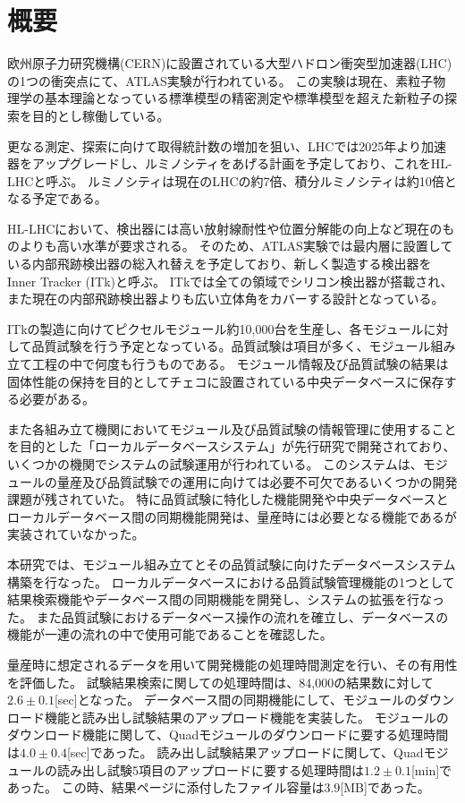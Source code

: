 \chapter*{概要}

欧州原子力研究機構(CERN)に設置されている大型ハドロン衝突型加速器(LHC)の1つの衝突点にて、ATLAS実験が行われている。
この実験は現在、素粒子物理学の基本理論となっている標準模型の精密測定や標準模型を超えた新粒子の探索を目的とし稼働している。

更なる測定、探索に向けて取得統計数の増加を狙い、LHCでは2025年より加速器をアップグレードし、ルミノシティをあげる計画を予定しており、これをHL-LHCと呼ぶ。
ルミノシティは現在のLHCの約7倍、積分ルミノシティは約10倍となる予定である。

HL-LHCにおいて、検出器には高い放射線耐性や位置分解能の向上など現在のものよりも高い水準が要求される。
そのため、ATLAS実験では最内層に設置している内部飛跡検出器の総入れ替えを予定しており、新しく製造する検出器をInner Tracker (ITk)と呼ぶ。
ITkでは全ての領域でシリコン検出器が搭載され、また現在の内部飛跡検出器よりも広い立体角をカバーする設計となっている。

ITkの製造に向けてピクセルモジュール約10,000台を生産し、各モジュールに対して品質試験を行う予定となっている。品質試験は項目が多く、モジュール組み立て工程の中で何度も行うものである。
モジュール情報及び品質試験の結果は固体性能の保持を目的としてチェコに設置されている中央データベースに保存する必要がある。

また各組み立て機関においてモジュール及び品質試験の情報管理に使用することを目的とした「ローカルデータベースシステム」が先行研究で開発されており、いくつかの機関でシステムの試験運用が行われている。
このシステムは、モジュールの量産及び品質試験での運用に向けては必要不可欠であるいくつかの開発課題が残されていた。
特に品質試験に特化した機能開発や中央データベースとローカルデータベース間の同期機能開発は、量産時には必要となる機能であるが実装されていなかった。

本研究では、モジュール組み立てとその品質試験に向けたデータベースシステム構築を行なった。
ローカルデータベースにおける品質試験管理機能の1つとして結果検索機能やデータベース間の同期機能を開発し、システムの拡張を行なった。
また品質試験におけるデータベース操作の流れを確立し、データベースの機能が一連の流れの中で使用可能であることを確認した。

量産時に想定されるデータを用いて開発機能の処理時間測定を行い、その有用性を評価した。
試験結果検索に関しての処理時間は、84,000の結果数に対して$2.6\pm 0.1$[sec]となった。
データベース間の同期機能にして、モジュールのダウンロード機能と読み出し試験結果のアップロード機能を実装した。
モジュールのダウンロード機能に関して、Quadモジュールのダウンロードに要する処理時間は$4.0\pm 0.4$[sec]であった。
読み出し試験結果アップロードに関して、Quadモジュールの読み出し試験5項目のアップロードに要する処理時間は$1.2\pm 0.1$[min]であった。
この時、結果ページに添付したファイル容量は$3.9$[MB]であった。



